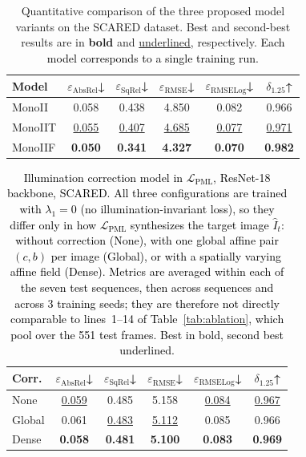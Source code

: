 \documentclass[a4paper,fleqn]{cas-dc}
\begin{document}
%
\begin{table}[h]
\centering
\begin{tabular}{lccccc}
\toprule
Model & $\varepsilon_\text{AbsRel}$↓ & 
       $\varepsilon_\text{SqRel}$↓ & 
       $\varepsilon_\text{RMSE}$↓ & 
       $\varepsilon_\text{RMSELog}$↓ & 
       $\delta_{1.25}$↑ \\
\midrule
MonoII  & 0.058 & 0.438 & 4.850 & 0.082 & 0.966 \\
MonoIIT & \underline{0.055} & \underline{0.407} & 
          \underline{4.685} & \underline{0.077} & 
          \underline{0.971} \\
MonoIIF & \textbf{0.050} & \textbf{0.341} & 
          \textbf{4.327} & \textbf{0.070} & 
          \textbf{0.982} \\
\bottomrule
\end{tabular}
\caption{Quantitative comparison of the three proposed 
model variants on the SCARED dataset. Best and 
second-best results are in \textbf{bold} and 
\underline{underlined}, respectively. \textcolor{black}{Each model corresponds to a single training run.}}
\label{tab:backbone_comparison}
\end{table}
%
\begin{table}[t]
\centering
\caption{\textcolor{black}{Illumination correction model in $\mathcal{L}_\text{PML}$, ResNet-18 backbone, SCARED. All three configurations are trained with $\lambda_1=0$ (no illumination-invariant loss), so they differ only in how $\mathcal{L}_\text{PML}$ synthesizes the target image $\hat{I}_t$: without correction (None), with one global affine pair $(c,b)$ per image (Global), or with a spatially varying affine field (Dense). Metrics are averaged within each of the seven test sequences, then across sequences and across 3 training seeds; they are therefore not directly comparable to lines~1--14 of Table~\ref{tab:ablation}, which pool over the 551 test frames. Best in bold, second best underlined.}}
\label{tab:calib-resnet-lam0}
\small
\begin{tabular}{lccccc}
\toprule
Corr. & $\varepsilon_\text{AbsRel}$↓ & 
       $\varepsilon_\text{SqRel}$↓ & 
       $\varepsilon_\text{RMSE}$↓ & 
       $\varepsilon_\text{RMSELog}$↓ & 
       $\delta_{1.25}$↑  \\
\midrule
None & \underline{0.059} & 0.485 & 5.158 & \underline{0.084} & \underline{0.967} \\
Global & 0.061 & \underline{0.483} & \underline{5.112} & 0.085 & 0.966 \\
Dense& \textbf{0.058} & \textbf{0.481} & \textbf{5.100} & \textbf{0.083} & \textbf{0.969} \\
\bottomrule
\end{tabular}
\end{table}
\end{document}
